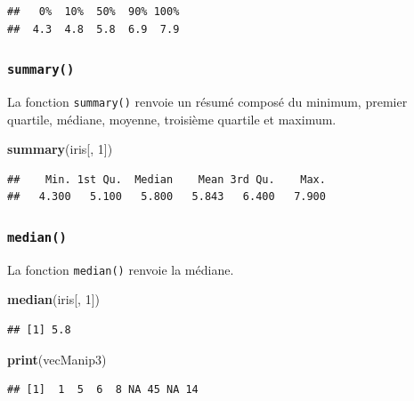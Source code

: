 \documentclass[]{book}
\newenvironment{Shaded}{\begin{snugshade}}{\end{snugshade}}
\newcommand{\DecValTok}[1]{\textcolor[rgb]{0.00,0.00,0.81}{#1}}
\newcommand{\KeywordTok}[1]{\textcolor[rgb]{0.13,0.29,0.53}{\textbf{#1}}}
\newcommand{\NormalTok}[1]{#1}
\begin{document}
\begin{verbatim}
##   0%  10%  50%  90% 100% 
##  4.3  4.8  5.8  6.9  7.9
\end{verbatim}

\hypertarget{l015summary}{%
\subsubsection{\texorpdfstring{\texttt{summary()}}{summary()}}\label{l015summary}}

La fonction \texttt{summary()} renvoie un résumé composé du minimum, premier quartile, médiane, moyenne, troisième quartile et maximum.

\begin{Shaded}
\begin{Highlighting}[]
\KeywordTok{summary}\NormalTok{(iris[, }\DecValTok{1}\NormalTok{])}
\end{Highlighting}
\end{Shaded}

\begin{verbatim}
##    Min. 1st Qu.  Median    Mean 3rd Qu.    Max. 
##   4.300   5.100   5.800   5.843   6.400   7.900
\end{verbatim}

\hypertarget{l015median}{%
\subsubsection{\texorpdfstring{\texttt{median()}}{median()}}\label{l015median}}

La fonction \texttt{median()} renvoie la médiane.

\begin{Shaded}
\begin{Highlighting}[]
\KeywordTok{median}\NormalTok{(iris[, }\DecValTok{1}\NormalTok{])}
\end{Highlighting}
\end{Shaded}

\begin{verbatim}
## [1] 5.8
\end{verbatim}

\begin{Shaded}
\begin{Highlighting}[]
\KeywordTok{print}\NormalTok{(vecManip3)}
\end{Highlighting}
\end{Shaded}

\begin{verbatim}
## [1]  1  5  6  8 NA 45 NA 14
\end{verbatim}
\end{document}

